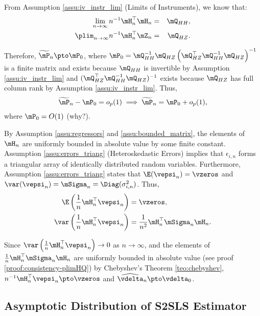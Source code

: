 From Assumption \ref{assu:iv_instr_lim} (Limits of Instruments), we know that:
\begin{eqnarray*}
\lim_{n\to \infty} n^{-1}\mH_n^\top\mH_n &=& \mQ_{HH},\\
\plim_{n\to \infty} n^{-1}\mH_n^\top\mZ_n &=& \mQ_{HZ}.
\end{eqnarray*}

Therefore,  $\widetilde{\mP}_n\pto \mP_0$, where $\mP_0=\mQ_{HH}^{-1}\mQ_{HZ}\left(\mQ_{HZ}^\top\mQ_{HH}^{-1}\mQ_{HZ}\right)^{-1}$ is a finite matrix and exists because $\mQ_{HH}$ is invertible by Assumption \ref{assu:iv_instr_lim} and $(\mQ_{HZ}^\top\mQ_{HH}^{-1}\mQ_{HZ})^{-1}$ exists because $\mQ_{HZ}$ has full column rank by Assumption \ref{assu:iv_instr_lim}. Thus,
\begin{equation}\label{eq:P_conver}
\widetilde{\mP}_n - \mP_0 = o_p(1)\implies \widetilde{\mP}_n= \mP_0 + o_p(1), 
\end{equation}
%
where $\mP_0 = O(1)$ (why?).

By Assumption \ref{assu:regressors} and \ref{assu:bounded_matrix}, the elements of $\mH_n$ are uniformly bounded in absolute value by some finite constant. Assumption \ref{assu:errors_triang} (Heteroskedastic Errors) implies that $\epsilon_{i,n}$ forms a triangular array of identically distributed random variables. Furthermore, Assumption \ref{assu:errors_triang} states that  $\E(\vepsi_n) = \vzeros$ and $\var(\vepsi_n) = \mSigma_n =\Diag(\sigma^2_{i, n})$. Thus,
\begin{equation*}
  \begin{aligned}
    \E\left(\frac{1}{n}\mH^\top_n\vepsi_n\right)   & = \vzeros, \\
    \var\left(\frac{1}{n}\mH^\top_n\vepsi_n\right) & = \frac{1}{n^2}\mH^\top_n\mSigma_n\mH_n.
  \end{aligned}
\end{equation*}

Since $\var\left(\frac{1}{n}\mH^\top_n\vepsi_n\right)\to 0$ as $n\to \infty$,  and the elements of $\frac{1}{n}\mH_n^\top\mSigma_n\mH_n$ are uniformly bounded in absolute value (see proof \ref{proof:consistency-plimHQ}) by Chebyshev's Theorem \ref{teo:chebyshev}, $n^{-1}\mH^\top_n\vepsi_n\pto \vzeros$ and $\widehat{\vdelta}_n\pto \vdelta_0$.


\subsection{Asymptotic Distribution of S2SLS Estimator}

